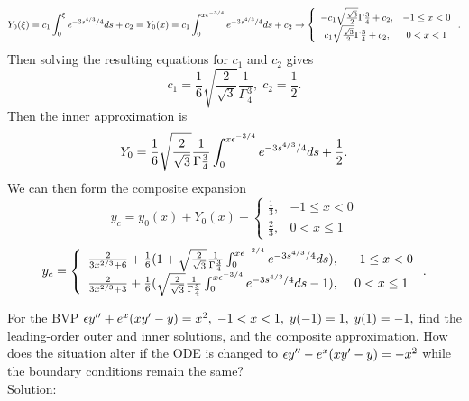 \[Y_0(\xi)=c_1\int_0^\xi e^{-3s^{4/3}/4}ds+c_2=Y_0(x)=c_1\int_0^{x\epsilon^{-3/4}}e^{-3s^{4/3}/4}ds+c_2\to \left\{\begin{array}{cc}-c_1\sqrt{\frac{\sqrt{3}}{2}}\Gamma{\frac{3}{4}}+c_2, &-1\leq x<0\\c_1\sqrt{\frac{\sqrt{3}}{2}}\Gamma{\frac{3}{4}}+c_2, &0<x<1\end{array}\right..\]
Then solving the resulting equations for $c_1$ and $c_2$ gives
\[c_1=\frac{1}{6}\sqrt{\frac{2}{\sqrt{3}}}\frac{1}{\Gamma{\frac{3}{4}}},\; c_2=\frac{1}{2}.\]
Then the inner approximation is
\[Y_0=\frac{1}{6}\sqrt{\frac{2}{\sqrt{3}}}\frac{1}{\Gamma{\frac{3}{4}}}\int_0^{x\epsilon^{-3/4}}e^{-3s^{4/3}/4}ds+\frac{1}{2}.\]
We can then form the composite expansion
\[y_c=y_0(x)+Y_0(x)-\left\{\begin{array}{cc}\frac{1}{3}, &-1\leq x<0\\\frac{2}{3}, &0<x\leq 1\end{array}\right.\]
\[y_c=\left\{\begin{array}{cc}\frac{2}{3x^{2/3}+6}+\frac{1}{6}(1+\sqrt{\frac{2}{\sqrt{3}}}\frac{1}{\Gamma{\frac{3}{4}}}\int_0^{x\epsilon^{-3/4}}e^{-3s^{4/3}/4}ds), &-1\leq x<0\\ \frac{2}{3x^{2/3}+3}+\frac{1}{6}(\sqrt{\frac{2}{\sqrt{3}}}\frac{1}{\Gamma{\frac{3}{4}}}\int_0^{x\epsilon^{-3/4}}e^{-3s^{4/3}/4}ds-1), &0<x\leq 1\end{array}\right..\]


\item For the BVP $\epsilon y'' + e^x (xy'-y) = x^2,\;-1<x<1,\;y(-1)=1,\;y(1)=-1,$  find the leading-order
outer and inner solutions, and the composite approximation.  How does the situation alter if the ODE is changed to $\epsilon y'' - e^x (xy'-y) = -x^2$ while the boundary conditions remain the same?\\

Solution:\\


